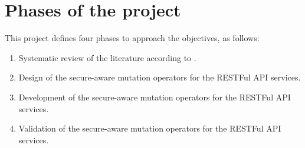 
\section{Phases of the project} \label{sec:phases}
This project defines four phases to approach the objectives, as follows:
  \begin{enumerate}
    \item Systematic review of the literature according to \cite{Kitchenham2002}.
    \item Design of the secure-aware mutation operators for the RESTFul API services.
    \item Development of the secure-aware mutation operators for the RESTFul API services.
    \item Validation of the secure-aware mutation operators for the RESTFul API services.
\end{enumerate}


